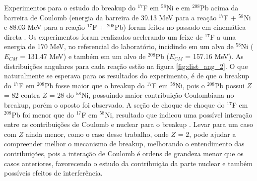 \documentclass[a4paper,12pt,oneside]{book}
\begin{document}
\par Experimentos para o estudo do breakup do $^{17}$F em $^{58}$Ni e em $^{208}$Pb acima da barreira de Coulomb (energia da barreira de 39.13 MeV para a reação $^{17}$F + $^{58}$Ni e 88.03 MeV para a reação $^{17}$F + $^{208}$Pb) foram feitos no passado em cinemática direta \cite{LIANG200922}. Os experimentos foram realizados acelerando um feixe de $^{17}$F a uma energia de 170 MeV, no referencial do laboratório, incidindo em um alvo de $^{58}$Ni ($E_{CM}$ = 131.47 MeV) e também em um alvo de $^{208}$Pb ($E_{CM}$ = 157.16 MeV). As distribuições angulares para cada reação estão na figura \ref{fig:dist_ang_2}. O que naturalmente se esperava para os resultados do experimento, é de que o breakup do $^{17}$F em $^{208}$Pb fosse maior que o breakup do $^{17}$F em $^{58}$Ni, pois o $^{208}$Pb possui $Z$ = 82 contra $Z$ = 28 do $^{58}$Ni, possuindo maior contribuição Coulombiana no breakup, porém o oposto foi observado. A seção de choque de choque do $^{17}$F em $^{208}$Pb foi menor que do $^{17}$F em $^{58}$Ni, resultado que indicou uma possível interação entre as contribuições de Coulomb e nuclear para o breakup \cite{LIANG200922, MORO_BREAKUP}. Levar para um caso com $Z$ ainda menor, como o caso desse trabalho, onde $Z$ = 2, pode ajudar a compreender melhor o mecanismo de breakup, melhorando o entendimento das contribuições, pois a interação de Coulomb é ordens de grandeza menor que os casos anteriores, favorecendo o estudo da contribuição da parte nuclear e também possíveis efeitos de interferência. 


\end{document}
